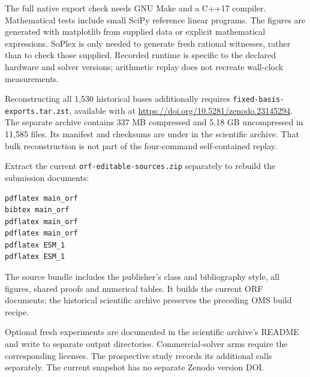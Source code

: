 The full native export check needs GNU Make and a C++17 compiler. Mathematical
tests include small SciPy reference linear programs. The figures are generated
with matplotlib from supplied data or explicit mathematical expressions.
SoPlex is only needed to generate fresh rational witnesses, rather than to check
those supplied. Recorded runtime is specific to the declared hardware and solver
versions; arithmetic replay does not recreate wall-clock measurements.

Reconstructing all 1,530 historical bases additionally requires
\texttt{fixed-basis-exports.tar.zst}, available with
 at \url{https://doi.org/10.5281/zenodo.23145294}.
The separate archive contains 337 MB compressed and 5.18 GB uncompressed in
11,585 files. Its manifest and checksums are under
 in the scientific archive. That bulk
reconstruction is not part of the four-command self-contained replay.

Extract the current \texttt{orf-editable-sources.zip} separately to rebuild the
submission documents:
\begin{lstlisting}
pdflatex main_orf
bibtex main_orf
pdflatex main_orf
pdflatex main_orf
pdflatex ESM_1
pdflatex ESM_1
\end{lstlisting}
The source bundle includes the publisher's class and bibliography style, all
figures, shared proofs and numerical tables. It builds the current ORF documents;
the historical scientific archive preserves the preceding OMS build recipe.

Optional fresh experiments are documented in the scientific archive's README and
write to separate output directories. Commercial-solver arms require the
corresponding licenses. The prospective study records its additional calls
separately. The current snapshot has no separate Zenodo version DOI.
